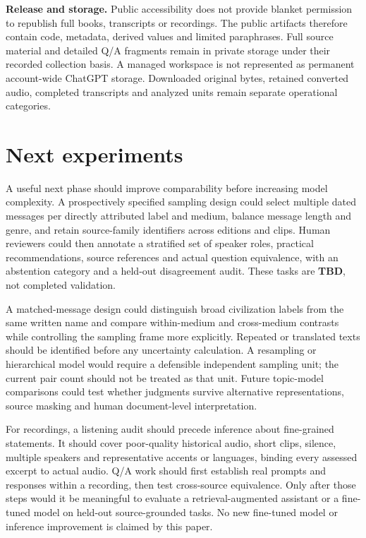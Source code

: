 \documentclass[
  11pt,
]{article}
\begin{document}
\textbf{Release and storage.} Public accessibility does not provide
blanket permission to republish full books, transcripts or recordings.
The public artifacts therefore contain code, metadata, derived values
and limited paraphrases. Full source material and detailed Q/A fragments
remain in private storage under their recorded collection basis. A
managed workspace is not represented as permanent account-wide ChatGPT
storage. Downloaded original bytes, retained converted audio, completed
transcripts and analyzed units remain separate operational categories.

\FloatBarrier

\section{Next experiments}\label{next-experiments}

A useful next phase should improve comparability before increasing model
complexity. A prospectively specified sampling design could select
multiple dated messages per directly attributed label and medium,
balance message length and genre, and retain source-family identifiers
across editions and clips. Human reviewers could then annotate a
stratified set of speaker roles, practical recommendations, source
references and actual question equivalence, with an abstention category
and a held-out disagreement audit. These tasks are \textbf{TBD}, not
completed validation.

A matched-message design could distinguish broad civilization labels
from the same written name and compare within-medium and cross-medium
contrasts while controlling the sampling frame more explicitly. Repeated
or translated texts should be identified before any uncertainty
calculation. A resampling or hierarchical model would require a
defensible independent sampling unit; the current pair count should not
be treated as that unit. Future topic-model comparisons could test
whether judgments survive alternative representations, source masking
and human document-level interpretation.

For recordings, a listening audit should precede inference about
fine-grained statements. It should cover poor-quality historical audio,
short clips, silence, multiple speakers and representative accents or
languages, binding every assessed excerpt to actual audio. Q/A work
should first establish real prompts and responses within a recording,
then test cross-source equivalence. Only after those steps would it be
meaningful to evaluate a retrieval-augmented assistant or a fine-tuned
model on held-out source-grounded tasks. No new fine-tuned model or
inference improvement is claimed by this paper.
\end{document}
